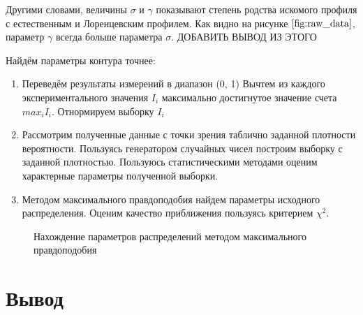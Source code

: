 \documentclass[a4paper, 14pt]{article}
\begin{document}
Другими словами, величины $\sigma$ и $\gamma$ показывают степень родства искомого профиля с естественным и Лоренцевским профилем.
Как видно на рисунке $\ref{fig:raw_data}$, параметр $\gamma$ всегда больше параметра $\sigma$. ДОБАВИТЬ ВЫВОД ИЗ ЭТОГО


Найдём параметры контура точнее:
\begin{enumerate}
    \item Переведём результаты измерений в диапазон (0, 1)
          \subitem Вычтем из каждого экспериментального значения $I_{i}$ максимально достигнутое значение счета $max_{i} I_{i}$.
          \subitem Отнормируем выборку $I_{i}$
    \item Рассмотрим полученные данные с точки зрения таблично заданной плотности вероятности. Пользуясь генератором случайных чисел построим выборку с заданной плотностью. Пользуюсь статистическими методами
          оценим характерные параметры полученной выборки.
    \item Методом максимального правдоподобия найдем параметры исходного распределения. Оценим качество приближения
          пользуясь критерием $\chi^{2}$.
\end{enumerate}
\begin{figure}[h]
    
    \caption{Нахождение параметров распределений методом максимального правдоподобия}
\end{figure}


\section*{\textcolor{header}{Вывод}}
\end{document}
